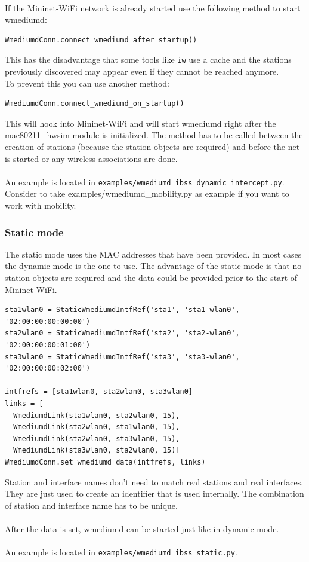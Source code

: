 \\
If the Mininet-WiFi network is already started use the following method to start wmediumd:
\begin{verbatim}
WmediumdConn.connect_wmediumd_after_startup()
\end{verbatim}
This has the disadvantage that some tools like \texttt{iw} use a cache and the stations previously discovered may appear even if they cannot be reached anymore.\\
To prevent this you can use another method:
\begin{verbatim}
WmediumdConn.connect_wmediumd_on_startup()
\end{verbatim}
This will hook into Mininet-WiFi and will start wmediumd right after the mac80211\_hwsim module is initialized. The method has to be called between the creation of stations (because the station objects are required) and before the net is started or any wireless associations are done.\\
\\
An example is located in \texttt{examples/wmediumd\_ibss\_dynamic\_intercept.py}.
\\
Consider to take examples/wmediumd\_mobility.py as example if you want to work with mobility.

\subsubsection{Static mode}
The static mode uses the MAC addresses that have been provided. In most cases the dynamic mode is the one to use. The advantage of the static mode is that no station objects are required and the data could be provided prior to the start of Mininet-WiFi.
\begin{verbatim}
sta1wlan0 = StaticWmediumdIntfRef('sta1', 'sta1-wlan0', '02:00:00:00:00:00')
sta2wlan0 = StaticWmediumdIntfRef('sta2', 'sta2-wlan0', '02:00:00:00:01:00')
sta3wlan0 = StaticWmediumdIntfRef('sta3', 'sta3-wlan0', '02:00:00:00:02:00')

intfrefs = [sta1wlan0, sta2wlan0, sta3wlan0]
links = [
  WmediumdLink(sta1wlan0, sta2wlan0, 15),
  WmediumdLink(sta2wlan0, sta1wlan0, 15),
  WmediumdLink(sta2wlan0, sta3wlan0, 15),
  WmediumdLink(sta3wlan0, sta2wlan0, 15)]
WmediumdConn.set_wmediumd_data(intfrefs, links)
\end{verbatim}
Station and interface names don't need to match real stations and real interfaces. They are just used to create an identifier that is used internally. The combination of station and interface name has to be unique.\\
\\
After the data is set, wmediumd can be started just like in dynamic mode.\\
\\
An example is located in \texttt{examples/wmediumd\_ibss\_static.py}.

